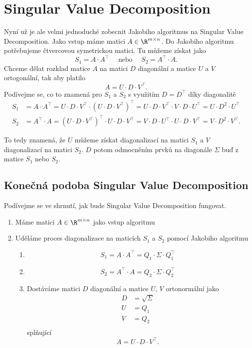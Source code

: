\section{Singular Value Decomposition}%
\label{sec:singular_value_decomposition}
Nyní už je ale velmi jednoduché zobecnit Jakobiho algoritmus na Singular Value Decomposition. Jako vstup máme matici $A \in \R^{m \times n}$. Do Jakobiho algoritmu potřebujeme čtvercovou symetrickou matici. Tu můžeme získat jako
\[
	S_{1} = A\cdot A^{\top} \quad \text{ nebo } \quad S_{2} = A^{\top}\cdot A.
\]
Chceme dělat rozklad matice $A$ na matici $D$ diagonální a matice $U$ a $V$ ortogonální, tak aby platilo
\[
	A = U\cdot D\cdot V^{\top}.
\]
Podívejme se, co to znamená pro $S_{1}$ a $S_{2}$ s využitím $D = D^{\top}$ díky diagonalitě
\begin{align*}
	S_{1} & = A\cdot A^{\top} = U\cdot D\cdot V^{\top}\cdot\left( U\cdot D\cdot V^{\top} \right)^{\top} = U\cdot D\cdot V^{\top}\cdot V\cdot D\cdot U^{\top} = U \cdot D^2 \cdot U^{\top}   \\
	S_{2} & = A^{\top}\cdot A = \left( U\cdot D\cdot V^{\top} \right)^{\top} \cdot U\cdot D\cdot V^{\top} = V\cdot D\cdot U^{\top}\cdot U\cdot D\cdot V^{\top} = V \cdot D^2 \cdot V^{\top}
	.\end{align*}

To tedy znamená, že $U$ můžeme získat diagonalizací na matici $S_{1}$ a $V$ diagonalizací na matici $S_{2}$. $D$ potom odmocněním prvků na diagonále $\Sigma$ buď z matice $S_1$ nebo $S_2$.


\subsection{Konečná podoba Singular Value Decomposition}%
\label{sub:konecna_podoba_singular_value_decomposition}
Podívejme se ve shrnutí, jak bude Singular Value Decomposition fungovat.
\begin{enumerate}[label=(\roman*)]
	\item Máme matici $A \in \R^{m\times n}$ jako vstup algoritmu
	\item Uděláme proces diagonalizace na maticích $S_1$ a $S_2$ pomocí Jakobiho algoritmu
	      \begin{enumerate}[label=(\alph*)]
		      \item
		            \[
			            S_1 = A\cdot A^{\top} = Q_{1}\cdot\Sigma\cdot Q_{1}^{\top}
		            \]
		      \item
		            \[
			            S_2 = A^{\top} \cdot A = Q_{2}\cdot\Sigma\cdot Q_{2}^{\top}
		            \]
		      \item Dostáváme matici $D$ diagonální a matice $U$, $V$ ortonormální jako
		            \begin{align*}
			            D & = \sqrt{\Sigma} \\
			            U & = Q_1           \\
			            V & = Q_2           \\
		            \end{align*}
		            splňující
		            \[
			            A = U\cdot D\cdot V^{\top}.
		            \]
	      \end{enumerate}
\end{enumerate}

